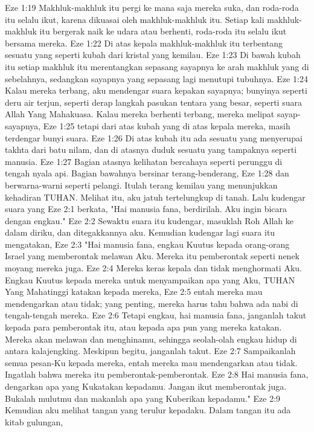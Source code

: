 Eze 1:19  Makhluk-makhluk itu pergi ke mana saja mereka suka, dan roda-roda itu selalu ikut, karena dikuasai oleh makhluk-makhluk itu. Setiap kali makhluk-makhluk itu bergerak naik ke udara atau berhenti, roda-roda itu selalu ikut bersama mereka.
Eze 1:22  Di atas kepala makhluk-makhluk itu terbentang sesuatu yang seperti kubah dari kristal yang kemilau.
Eze 1:23  Di bawah kubah itu setiap makhluk itu merentangkan sepasang sayapnya ke arah makhluk yang di sebelahnya, sedangkan sayapnya yang sepasang lagi menutupi tubuhnya.
Eze 1:24  Kalau mereka terbang, aku mendengar suara kepakan sayapnya; bunyinya seperti deru air terjun, seperti derap langkah pasukan tentara yang besar, seperti suara Allah Yang Mahakuasa. Kalau mereka berhenti terbang, mereka melipat sayap-sayapnya,
Eze 1:25  tetapi dari atas kubah yang di atas kepala mereka, masih terdengar bunyi suara.
Eze 1:26  Di atas kubah itu ada sesuatu yang menyerupai takhta dari batu nilam, dan di atasnya duduk sesuatu yang tampaknya seperti manusia.
Eze 1:27  Bagian atasnya kelihatan bercahaya seperti perunggu di tengah nyala api. Bagian bawahnya bersinar terang-benderang,
Eze 1:28  dan berwarna-warni seperti pelangi. Itulah terang kemilau yang menunjukkan kehadiran TUHAN. Melihat itu, aku jatuh tertelungkup di tanah. Lalu kudengar suara yang
Eze 2:1  berkata, "Hai manusia fana, berdirilah. Aku ingin bicara dengan engkau."
Eze 2:2  Sewaktu suara itu kudengar, masuklah Roh Allah ke dalam diriku, dan ditegakkannya aku. Kemudian kudengar lagi suara itu mengatakan,
Eze 2:3  "Hai manusia fana, engkau Kuutus kepada orang-orang Israel yang memberontak melawan Aku. Mereka itu pemberontak seperti nenek moyang mereka juga.
Eze 2:4  Mereka keras kepala dan tidak menghormati Aku. Engkau Kuutus kepada mereka untuk menyampaikan apa yang Aku, TUHAN Yang Mahatinggi katakan kepada mereka,
Eze 2:5  entah mereka mau mendengarkan atau tidak; yang penting, mereka harus tahu bahwa ada nabi di tengah-tengah mereka.
Eze 2:6  Tetapi engkau, hai manusia fana, janganlah takut kepada para pemberontak itu, atau kepada apa pun yang mereka katakan. Mereka akan melawan dan menghinamu, sehingga seolah-olah engkau hidup di antara kalajengking. Meskipun begitu, janganlah takut.
Eze 2:7  Sampaikanlah semua pesan-Ku kepada mereka, entah mereka mau mendengarkan atau tidak. Ingatlah bahwa mereka itu pemberontak-pemberontak.
Eze 2:8  Hai manusia fana, dengarkan apa yang Kukatakan kepadamu. Jangan ikut memberontak juga. Bukalah mulutmu dan makanlah apa yang Kuberikan kepadamu."
Eze 2:9  Kemudian aku melihat tangan yang terulur kepadaku. Dalam tangan itu ada kitab gulungan,

